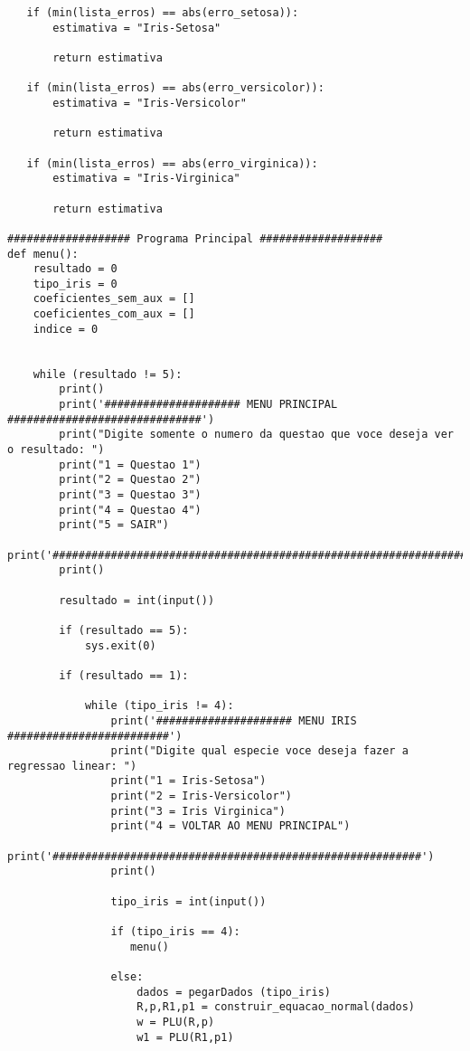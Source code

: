 \documentclass[a4paper,12pt,twoside]{article}
\begin{document}
\begin{lstlisting}
   if (min(lista_erros) == abs(erro_setosa)):
       estimativa = "Iris-Setosa"
       
       return estimativa
   
   if (min(lista_erros) == abs(erro_versicolor)):
       estimativa = "Iris-Versicolor"
       
       return estimativa
   
   if (min(lista_erros) == abs(erro_virginica)):
       estimativa = "Iris-Virginica"
       
       return estimativa
    
################### Programa Principal ###################
def menu():
    resultado = 0
    tipo_iris = 0
    coeficientes_sem_aux = []
    coeficientes_com_aux = []
    indice = 0
    
    
    while (resultado != 5):    
        print()
        print('##################### MENU PRINCIPAL ##############################')
        print("Digite somente o numero da questao que voce deseja ver o resultado: ")
        print("1 = Questao 1")
        print("2 = Questao 2")
        print("3 = Questao 3")
        print("4 = Questao 4")
        print("5 = SAIR")
        print('###################################################################')
        print()
        
        resultado = int(input())
        
        if (resultado == 5):
            sys.exit(0)
    
        if (resultado == 1):
            
            while (tipo_iris != 4):
                print('##################### MENU IRIS #########################')
                print("Digite qual especie voce deseja fazer a regressao linear: ")
                print("1 = Iris-Setosa")
                print("2 = Iris-Versicolor")
                print("3 = Iris Virginica")
                print("4 = VOLTAR AO MENU PRINCIPAL")
                print('#########################################################')
                print()
             
                tipo_iris = int(input())
                
                if (tipo_iris == 4):
                   menu()
                   
                else:
                    dados = pegarDados (tipo_iris)
                    R,p,R1,p1 = construir_equacao_normal(dados)
                    w = PLU(R,p)
                    w1 = PLU(R1,p1)
                              

\end{lstlisting}
\end{document}
